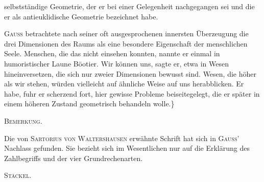 %
selbstständige Geometrie, der er bei einer Gelegenheit nachgegangen sei und die er als antieuklidische Geometrie bezeichnet habe.

\textsc{Gauss} betrachtete nach seiner oft ausgesprochenen innersten Überzeugung die drei Dimensionen des Raums als eine besondere Eigenschaft der menschlichen Seele. Menschen, die das nicht einsehen konnten, nannte er einmal in humoristischer Laune Böotier. Wir können uns, sagte er, etwa in Wesen hineinversetzen, die sich nur zweier Dimensionen bewusst sind. Wesen, die höher als wir stehen, würden vielleicht auf ähnliche Weise auf uns herabblicken. Er habe, fuhr er scherzend fort, hier gewisse Probleme beiseitegelegt, die er später in einem höheren Zustand geometrisch behandeln wolle.\}

\begin{center}\textsc{Bemerkung.}\end{center}

Die von \textsc{Sartorius von Waltershausen} erwähnte Schrift hat sich in \textsc{Gauss}’ Nachlass gefunden. Sie bezieht sich im Wesentlichen nur auf die Erklärung des Zahlbegriffs und der vier Grundrechenarten.

\hfill \textsc{Stäckel}.
